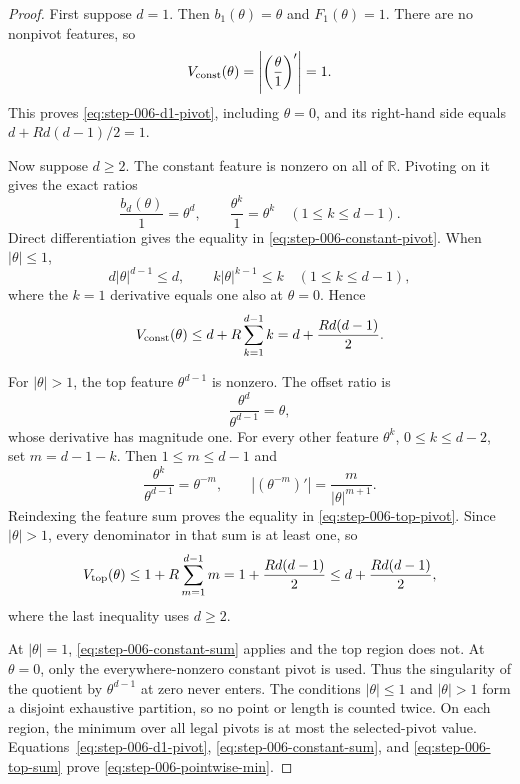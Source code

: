\begin{proof}
First suppose $d=1$.  Then $b_1(\theta)=\theta$ and $F_1(\theta)=1$.
There are no nonpivot features, so
\[
V_{\rm const}(\theta)
=\left|\left(\frac\theta1\right)'\right|=1.
\]
This proves \eqref{eq:step-006-d1-pivot}, including $\theta=0$, and its
right-hand side equals $d+Rd(d-1)/2=1$.

Now suppose $d\geq2$.  The constant feature is nonzero on all of
$\mathbb R$.  Pivoting on it gives the exact ratios
\[
\frac{b_d(\theta)}1=\theta^d,
\qquad
\frac{\theta^k}{1}=\theta^k
\quad(1\leq k\leq d-1).
\]
Direct differentiation gives the equality in
\eqref{eq:step-006-constant-pivot}.  When $|\theta|\leq1$,
\[
d|\theta|^{d-1}\leq d,
\qquad
k|\theta|^{k-1}\leq k
\quad(1\leq k\leq d-1),
\]
where the $k=1$ derivative equals one also at $\theta=0$.  Hence
\begin{equation}
V_{\rm const}(\theta)
\leq d+R\sum_{k=1}^{d-1}k
=d+\frac{Rd(d-1)}2.
\label{eq:step-006-constant-sum}
\end{equation}

For $|\theta|>1$, the top feature $\theta^{d-1}$ is nonzero.  The offset
ratio is
\[
\frac{\theta^d}{\theta^{d-1}}=\theta,
\]
whose derivative has magnitude one.  For every other feature $\theta^k$,
$0\leq k\leq d-2$, set $m=d-1-k$.  Then $1\leq m\leq d-1$ and
\[
\frac{\theta^k}{\theta^{d-1}}=\theta^{-m},
\qquad
| (\theta^{-m})' |
=\frac{m}{|\theta|^{m+1}}.
\]
Reindexing the feature sum proves the equality in
\eqref{eq:step-006-top-pivot}.  Since $|\theta|>1$, every denominator in
that sum is at least one, so
\begin{equation}
V_{\rm top}(\theta)
\leq1+R\sum_{m=1}^{d-1}m
=1+\frac{Rd(d-1)}2
\leq d+\frac{Rd(d-1)}2,
\label{eq:step-006-top-sum}
\end{equation}
where the last inequality uses $d\geq2$.

At $|\theta|=1$, \eqref{eq:step-006-constant-sum} applies and the top
region does not.  At $\theta=0$, only the everywhere-nonzero constant pivot
is used.  Thus the singularity of the quotient by $\theta^{d-1}$ at zero
never enters.  The conditions $|\theta|\leq1$ and $|\theta|>1$ form a
disjoint exhaustive partition, so no point or length is counted twice.  On
each region, the minimum over all legal pivots is at most the selected-pivot
value.  Equations~\eqref{eq:step-006-d1-pivot},
\eqref{eq:step-006-constant-sum}, and \eqref{eq:step-006-top-sum} prove
\eqref{eq:step-006-pointwise-min}.
\end{proof}

